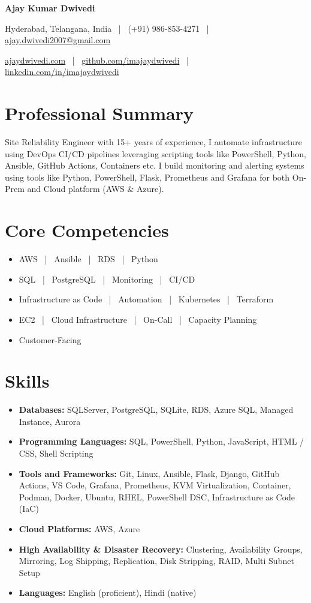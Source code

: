 \documentclass[10pt,a4paper]{article}
\begin{document}
\begin{center}
{\Huge\bfseries Ajay Kumar Dwivedi}

\vspace{6pt}
Hyderabad, Telangana, India ~|~ (+91) 986-853-4271 ~|~ \href{mailto:ajay.dwivedi2007@gmail.com}{ajay.dwivedi2007@gmail.com}

\vspace{2pt}
\href{https://ajaydwivedi.com/}{ajaydwivedi.com} ~|~ \href{https://github.com/imajaydwivedi}{github.com/imajaydwivedi} ~|~ \href{https://linkedin.com/in/imajaydwivedi/}{linkedin.com/in/imajaydwivedi}
\end{center}

\section{Professional Summary}
Site Reliability Engineer with 15+ years of experience, I automate infrastructure using DevOps CI/CD pipelines leveraging scripting tools like PowerShell, Python, Ansible, GitHub Actions, Containers etc. I build monitoring and alerting systems using tools like Python, PowerShell, Flask, Prometheus and Grafana for both On-Prem and Cloud platform (AWS \& Azure).

\section{Core Competencies}
\begin{itemize}
  \item AWS  ~|~  Ansible  ~|~  RDS  ~|~  Python
  \item SQL  ~|~  PostgreSQL  ~|~  Monitoring  ~|~  CI/CD
  \item Infrastructure as Code  ~|~  Automation  ~|~  Kubernetes  ~|~  Terraform
  \item EC2  ~|~  Cloud Infrastructure  ~|~  On-Call  ~|~  Capacity Planning
  \item Customer-Facing
\end{itemize}

\section{Skills}
\begin{itemize}
  \item \textbf{Databases:} SQLServer, PostgreSQL, SQLite, RDS, Azure SQL, Managed Instance, Aurora
  \item \textbf{Programming Languages:} SQL, PowerShell, Python, JavaScript, HTML / CSS, Shell Scripting
  \item \textbf{Tools and Frameworks:} Git, Linux, Ansible, Flask, Django, GitHub Actions, VS Code, Grafana, Prometheus, KVM Virtualization, Container, Podman, Docker, Ubuntu, RHEL, PowerShell DSC, Infrastructure as Code (IaC)
  \item \textbf{Cloud Platforms:} AWS, Azure
  \item \textbf{High Availability \& Disaster Recovery:} Clustering, Availability Groups, Mirroring, Log Shipping, Replication, Disk Stripping, RAID, Multi Subnet Setup
  \item \textbf{Languages:} English (proficient), Hindi (native)
\end{itemize}
\end{document}
